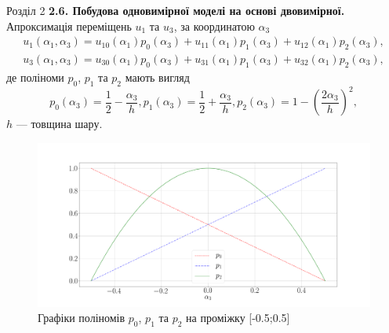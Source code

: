 \documentclass[8pt]{beamer}
\numberwithin{figure}{section}
\numberwithin{equation}{section}
\numberwithin{table}{section}
\begin{document}
\begin{frame}{Розділ 2}
\textbf{2.6. Побудова одновимірної моделі на основі двовимірної.}
\linebreak
\linebreak
Апроксимація переміщень $u_1$ та $u_3$, за координатою $\alpha_3$ 
\begin{align}
u_1 \left( \alpha_1, \alpha_3 \right) = u_{10} \left( \alpha_1\right)p_0 \left( \alpha_3\right)+u_{11} \left( \alpha_1\right)p_1 \left( \alpha_3\right)+u_{12} \left( \alpha_1\right)p_2 \left( \alpha_3\right),\\
u_3 \left( \alpha_1, \alpha_3 \right) = u_{30} \left( \alpha_1\right)p_0 \left( \alpha_3\right)+u_{31} \left( \alpha_1\right)p_1 \left( \alpha_3\right)+u_{32} \left( \alpha_1\right)p_2 \left( \alpha_3\right),
\end{align}
де поліноми $p_0$, $p_1$ та $p_2$ мають вигляд
\begin{equation}
p_0 \left( \alpha_3\right) = \frac12-\frac{\alpha_3}{h},
p_1 \left( \alpha_3\right) = \frac12+\frac{\alpha_3}{h},
p_2 \left( \alpha_3\right) = 1-\left(\frac{2\alpha_3}{h}\right)^2,
\end{equation}
$h$ --- товщина шару.
\begin{figure}
\includegraphics[scale=0.1]{pic/polin.png}
\caption{Графіки поліномів $p_0$, $p_1$ та $p_2$ на проміжку [-0.5;0.5]}
\end{figure}

\end{frame}
\end{document}
